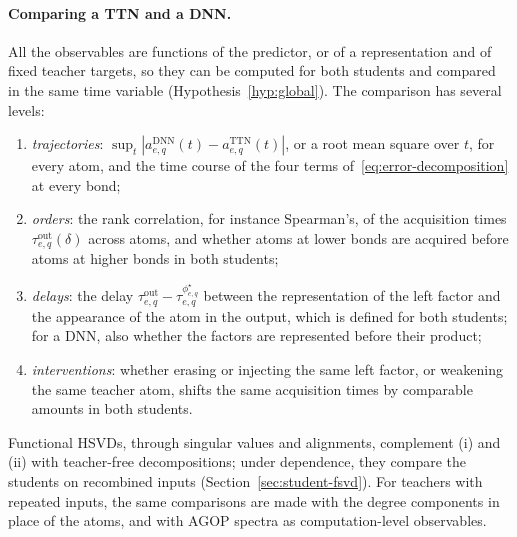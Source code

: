 \documentclass[11pt]{article}
\theoremstyle{definition}
\numberwithin{equation}{section}
\begin{document}
\paragraph{Comparing a TTN and a DNN.}
All the observables are functions of the predictor, or of a representation and of fixed teacher targets, so they can be computed for both students and compared in the same time variable (Hypothesis~\ref{hyp:global}). The comparison has several levels:
\begin{enumerate}[label=(\roman*),nosep]
\item \emph{trajectories}: $\sup_t|a^{\mathrm{DNN}}_{e,q}(t)-a^{\mathrm{TTN}}_{e,q}(t)|$, or a root mean square over $t$, for every atom, and the time course of the four terms of~\eqref{eq:error-decomposition} at every bond;
\item \emph{orders}: the rank correlation, for instance Spearman's, of the acquisition times $\tau^{\mathrm{out}}_{e,q}(\delta)$ across atoms, and whether atoms at lower bonds are acquired before atoms at higher bonds in both students;
\item \emph{delays}: the delay $\tau^{\mathrm{out}}_{e,q}-\tau^{\phi^\star_{e,q}}_{e,q}$ between the representation of the left factor and the appearance of the atom in the output, which is defined for both students; for a DNN, also whether the factors are represented before their product;
\item \emph{interventions}: whether erasing or injecting the same left factor, or weakening the same teacher atom, shifts the same acquisition times by comparable amounts in both students.
\end{enumerate}
Functional HSVDs, through singular values and alignments, complement (i) and (ii) with teacher-free decompositions; under dependence, they compare the students on recombined inputs (Section~\ref{sec:student-fsvd}). For teachers with repeated inputs, the same comparisons are made with the degree components in place of the atoms, and with AGOP spectra as computation-level observables.
\end{document}
